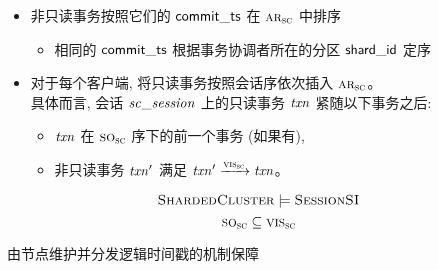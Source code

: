 \begin{frame}{}
  \begin{definition}
	  \begin{itemize}
	    \setlength{\itemsep}{10pt}
	    \item 非只读事务按照它们的 ${\sf commit\_ts}$ 在 $\textsc{ar}_{\textsc{sc}}$ 中排序 \\[5pt]
        \begin{itemize}
          \item 相同的 ${\sf commit\_ts}$ 根据事务协调者所在的分区 ${\sf shard\_id}$ 定序
        \end{itemize}
	    \item 对于每个客户端, 将只读事务按照会话序依次插入 $\textsc{ar}_{\textsc{sc}}$。\\[5pt]
	      具体而言, 会话 $\mathit{sc\_session}$ 上的只读事务 $\mathit{txn}$ 紧随以下事务之后: \\[5pt]
	      \begin{itemize}
	  	    \setlength{\itemsep}{5pt}
          \item $\mathit{txn}$ 在 $\textsc{so}_{\textsc{sc}}$ 序下的前一个事务 (如果有),
          \item 非只读事务 $\mathit{txn}'$ 满足 $\mathit{txn}' \xrightarrow{\textsc{vis}_{\textsc{sc}}} \mathit{txn}$。
        \end{itemize}
    \end{itemize}
  \end{definition}
\end{frame}

\begin{frame}{}
  \[
  	\textsc{ShardedCluster} \models \textsc{SessionSI}
  \]
  \[
  	\textsc{so}_{\textsc{sc}} \subseteq \textsc{vis}_{\textsc{sc}}
  \]
  \begin{center}
    由节点维护并分发逻辑时间戳的机制保障
  \end{center}
\end{frame}
